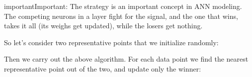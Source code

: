 \documentclass[letterpaper,10pt,english]{jupyterBook}
\begin{document}
\begin{sphinxadmonition}{important}{Important:}
\sphinxAtStartPar
The  strategy is an important concept in ANN modeling. The competing neurons in a layer fight for the signal, and the one that wins, takes it all (its weighs get updated), while the losers get nothing.
\end{sphinxadmonition}

\sphinxAtStartPar
So let’s consider two representative points that we initialize randomly:

\begin{sphinxVerbatim}[commandchars=\\\{\}]
\PYG{p}{[} \PYG{p}{]}
\PYG{p}{[} \PYG{p}{]}
\end{sphinxVerbatim}

\sphinxAtStartPar
Then we carry out the above algorithm. For each data point we find the nearest representative point out of the two, and update only the winner:
\end{document}
